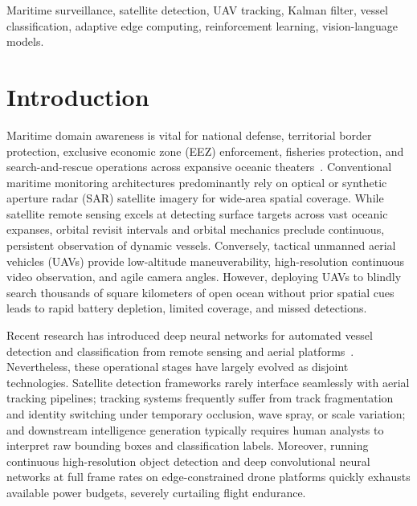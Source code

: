 \documentclass[conference]{IEEEtran}
\begin{document}
\begin{IEEEkeywords}
Maritime surveillance, satellite detection, UAV tracking, Kalman filter, vessel classification, adaptive edge computing, reinforcement learning, vision-language models.
\end{IEEEkeywords}

\section{Introduction}

Maritime domain awareness is vital for national defense, territorial border protection, exclusive economic zone (EEZ) enforcement, fisheries protection, and search-and-rescue operations across expansive oceanic theaters~\cite{pohontu2024}. Conventional maritime monitoring architectures predominantly rely on optical or synthetic aperture radar (SAR) satellite imagery for wide-area spatial coverage. While satellite remote sensing excels at detecting surface targets across vast oceanic expanses, orbital revisit intervals and orbital mechanics preclude continuous, persistent observation of dynamic vessels. Conversely, tactical unmanned aerial vehicles (UAVs) provide low-altitude maneuverability, high-resolution continuous video observation, and agile camera angles. However, deploying UAVs to blindly search thousands of square kilometers of open ocean without prior spatial cues leads to rapid battery depletion, limited coverage, and missed detections.

Recent research has introduced deep neural networks for automated vessel detection and classification from remote sensing and aerial platforms~\cite{tang2024,sun2021,yu2024,ren2026,kizilkaya2025}. Nevertheless, these operational stages have largely evolved as disjoint technologies. Satellite detection frameworks rarely interface seamlessly with aerial tracking pipelines; tracking systems frequently suffer from track fragmentation and identity switching under temporary occlusion, wave spray, or scale variation; and downstream intelligence generation typically requires human analysts to interpret raw bounding boxes and classification labels. Moreover, running continuous high-resolution object detection and deep convolutional neural networks at full frame rates on edge-constrained drone platforms quickly exhausts available power budgets, severely curtailing flight endurance.
\end{document}
